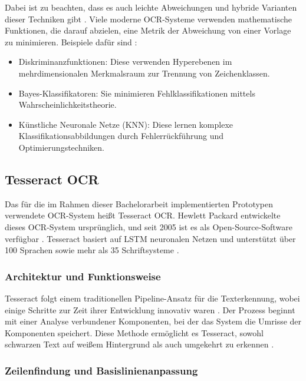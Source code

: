 Dabei ist zu beachten, dass es auch leichte Abweichungen und hybride Varianten dieser Techniken gibt \cite{BorovikovEugene2014Asom}. Viele moderne \gls{OCR}-Systeme verwenden mathematische Funktionen, die darauf abzielen, eine Metrik der Abweichung von einer Vorlage zu minimieren. Beispiele dafür sind \cite{BorovikovEugene2014Asom}:

\begin{itemize}
	\item Diskriminanzfunktionen: Diese verwenden Hyperebenen im mehrdimensionalen Merkmalsraum zur Trennung von Zeichenklassen.
	\item Bayes-Klassifikatoren: Sie minimieren Fehlklassifikationen mittels Wahrscheinlichkeitstheorie.
	\item Künstliche Neuronale Netze (KNN): Diese lernen komplexe Klassifikationsabbildungen durch Fehlerrückführung und Optimierungstechniken.
\end{itemize}

\subsection{Tesseract OCR}
\label{subsec:tesseract-ocr}

Das für die im Rahmen dieser Bachelorarbeit implementierten Prototypen verwendete \gls{OCR}-System heißt Tesseract \gls{OCR}. Hewlett Packard entwickelte dieses \gls{OCR}-System ursprünglich, und seit 2005 ist es als Open-Source-Software verfügbar \cite{SmithR_2007_AOot}. Tesseract basiert auf \gls{LSTM} neuronalen Netzen und unterstützt über 100 Sprachen sowie mehr als 35 Schriftsysteme \cite{tesseract_ocr_user_manual}. 

\subsubsection{Architektur und Funktionsweise}
\label{subsubsec:architektur-und-funktionsweise}

Tesseract folgt einem traditionellen Pipeline-Ansatz für die Texterkennung, wobei einige Schritte zur Zeit ihrer Entwicklung innovativ waren \cite{SmithR_2007_AOot}. Der Prozess beginnt mit einer Analyse verbundener Komponenten, bei der das System die Umrisse der Komponenten speichert. Diese Methode ermöglicht es Tesseract, sowohl schwarzen Text auf weißem Hintergrund als auch umgekehrt zu erkennen \cite{SmithR_2007_AOot}.

\subsubsection{Zeilenfindung und Basislinienanpassung}
\label{subsubsec:zeilenfindung-und-basislinienanpassung}

